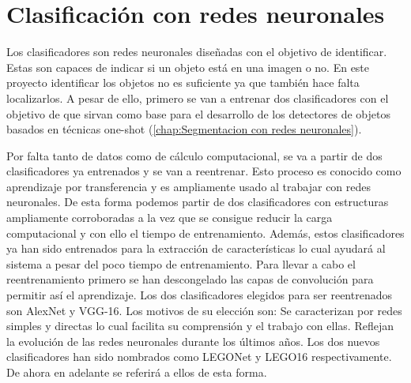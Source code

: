 \chapter{Clasificación con redes neuronales}
\label{chap:Clasificacion con redes neuronales}

Los clasificadores son redes neuronales diseñadas con el objetivo de identificar. Estas son capaces de indicar si un objeto está en una imagen o no. En este proyecto identificar los objetos no es suficiente ya que también hace falta localizarlos. A pesar de ello, primero se van a entrenar dos clasificadores con el objetivo de que sirvan como base para el desarrollo de los detectores de objetos basados en técnicas one-shot (\autoref{chap:Segmentacion con redes neuronales}).

Por falta tanto de datos como de cálculo computacional, se va a partir de dos clasificadores ya entrenados y se van a reentrenar. Esto proceso es conocido como aprendizaje por transferencia y es ampliamente usado al trabajar con redes neuronales. De esta forma podemos partir de dos clasificadores con estructuras ampliamente corroboradas a la vez que se consigue reducir la carga computacional y con ello el tiempo de entrenamiento. Además, estos clasificadores ya han sido entrenados para la extracción de características lo cual ayudará al sistema a pesar del poco tiempo de entrenamiento. Para llevar a cabo el reentrenamiento primero se han descongelado las capas de convolución para permitir así el aprendizaje. Los dos clasificadores elegidos para ser reentrenados son AlexNet y VGG-16. Los motivos de su elección son: Se caracterizan por redes simples y directas lo cual facilita su comprensión y el trabajo con ellas. Reflejan la evolución de las redes neuronales durante los últimos años. Los dos nuevos clasificadores han sido nombrados como LEGONet y LEGO16 respectivamente. De ahora en adelante se referirá a ellos de esta forma.

